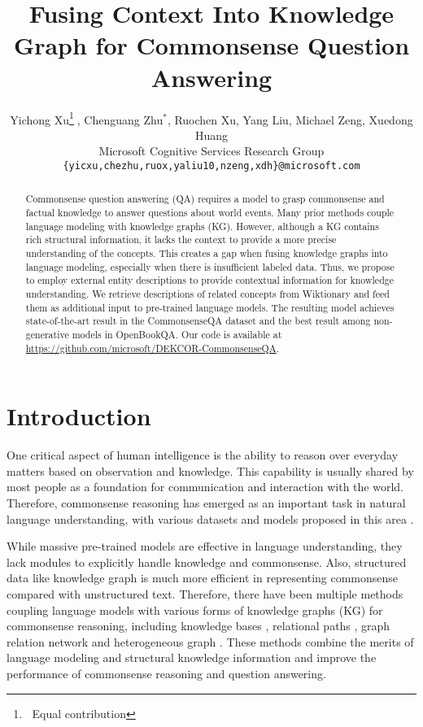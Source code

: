 \documentclass[11pt,a4paper]{article}
\title{Fusing Context Into Knowledge Graph for Commonsense Question Answering}
\author{Yichong Xu\thanks{$\;\;$Equal contribution}$\;$, Chenguang Zhu$^*$, Ruochen Xu, Yang Liu, Michael Zeng, Xuedong Huang \\
Microsoft Cognitive Services Research Group\\
  \texttt{\{yicxu,chezhu,ruox,yaliu10,nzeng,xdh\}@microsoft.com} \\}
\date{}
\begin{document}
\maketitle
\begin{abstract}
Commonsense question answering (QA) requires a model to grasp commonsense and factual knowledge to answer questions about world events. Many prior methods couple language modeling with knowledge graphs (KG). However, although a KG contains rich structural information, it lacks the context to provide a more precise understanding of the concepts. This creates a gap when fusing knowledge graphs into language modeling, especially when there is insufficient labeled data.
Thus, we propose to employ external entity descriptions to provide contextual information for knowledge understanding. 
We retrieve descriptions of related concepts from Wiktionary and feed them as additional input to pre-trained language models. The resulting model achieves state-of-the-art result in the CommonsenseQA dataset and the best result among non-generative models in OpenBookQA.
Our code is available at \url{https://github.com/microsoft/DEKCOR-CommonsenseQA}.
\end{abstract}


\section{Introduction}
\label{sec:intro}
One critical aspect of human intelligence is the ability to reason over everyday matters based on observation and knowledge. This capability is usually shared by most people as a foundation for communication and interaction with the world.
Therefore, commonsense reasoning has emerged as an important task in natural language understanding, with various datasets and models proposed in this area \citep{ma2019towards,csqa,wang2020connecting,lv2020graph}.

While massive pre-trained models \citep{bert,roberta} are effective in language understanding, they lack modules to explicitly handle knowledge and commonsense. Also, structured data like knowledge graph is much more efficient in representing commonsense compared with unstructured text.
Therefore, there have been multiple methods coupling language models with various forms of knowledge graphs (KG) for commonsense reasoning, including knowledge bases \citep{sap2019atomic,yu2020survey}, relational paths \citep{kagnet}, graph relation network \citep{feng2020scalable} and heterogeneous graph \citep{lv2020graph}. These methods combine the merits of language modeling and structural knowledge information and improve the performance of commonsense reasoning and question answering. 
\end{document}
